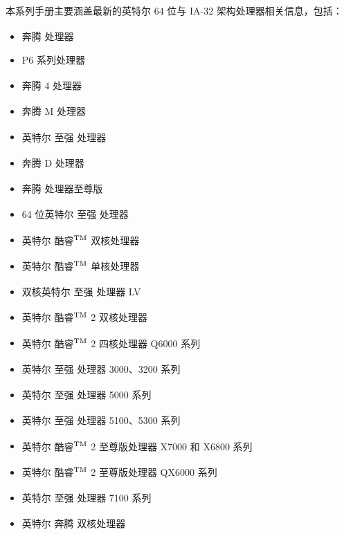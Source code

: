 \documentclass{article}
\begin{document}
本系列手册主要涵盖最新的英特尔\textsuperscript{\textregistered}  64 位与 IA-32 架构处理器相关信息，包括：

\begin{itemize}
\item 奔腾\textsuperscript{\textregistered}  处理器
\item P6 系列处理器
\item 奔腾\textsuperscript{\textregistered}  4 处理器
\item 奔腾\textsuperscript{\textregistered}  M 处理器
\item 英特尔\textsuperscript{\textregistered}  至强\textsuperscript{\textregistered}  处理器
\item 奔腾\textsuperscript{\textregistered}  D 处理器
\item 奔腾\textsuperscript{\textregistered}  处理器至尊版
\item 64 位英特尔\textsuperscript{\textregistered}  至强\textsuperscript{\textregistered}  处理器
\item 英特尔\textsuperscript{\textregistered}  酷睿$^{\rm{TM}}$ 双核处理器
\item 英特尔\textsuperscript{\textregistered}  酷睿$^{\rm{TM}}$ 单核处理器
\item 双核英特尔\textsuperscript{\textregistered}  至强\textsuperscript{\textregistered}  处理器 LV
\item 英特尔\textsuperscript{\textregistered}  酷睿$^{\rm{TM}}$ 2 双核处理器
\item 英特尔\textsuperscript{\textregistered}  酷睿$^{\rm{TM}}$ 2 四核处理器 Q6000 系列
\item 英特尔\textsuperscript{\textregistered}  至强\textsuperscript{\textregistered}  处理器 3000、3200 系列
\item 英特尔\textsuperscript{\textregistered}  至强\textsuperscript{\textregistered}  处理器 5000 系列
\item 英特尔\textsuperscript{\textregistered}  至强\textsuperscript{\textregistered}  处理器 5100、5300 系列
\item 英特尔\textsuperscript{\textregistered}  酷睿$^{\rm{TM}}$ 2 至尊版处理器 X7000 和 X6800 系列
\item 英特尔\textsuperscript{\textregistered}  酷睿$^{\rm{TM}}$ 2 至尊版处理器 QX6000 系列
\item 英特尔\textsuperscript{\textregistered}  至强\textsuperscript{\textregistered}  处理器 7100 系列
\item 英特尔\textsuperscript{\textregistered}  奔腾\textsuperscript{\textregistered}  双核处理器

\end{itemize}
\end{document}

